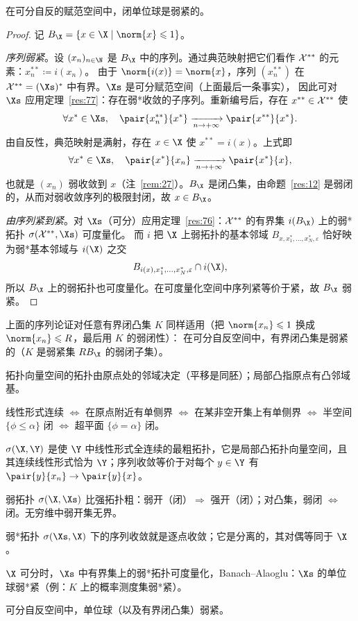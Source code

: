 \begin{corollary}
\label{res:79}
在可分自反的赋范空间中，闭单位球是弱紧的。
\end{corollary}

\begin{proof}
记 $B_\X=\{x\in\X\mid\norm{x}\leqslant1\}$。

\emph{序列弱紧}。设 $(x_n)_{n\in\N}$ 是 $B_\X$ 中的序列。通过典范映射把它们看作 $\mathcal{X}^{**}$ 的元素：$x^{**}_n\coloneqq i(x_n)$。
由于 $\norm{i(x)}=\norm{x}$，序列 $(x^{**}_n)$ 在 $\Xss=(\Xs)^*$ 中有界。$\Xs$ 是可分赋范空间（上面最后一条事实），
因此可对 $\Xs$ 应用定理~\ref{res:77}：存在弱*收敛的子序列。重新编号后，存在 $x^{**}\in\mathcal{X}^{**}$ 使
\[
  \forall x^*\in\Xs,\quad\pair{x^{**}_n}{x^*}\xrightarrow[n\to+\infty]{}\pair{x^{**}}{x^*}.
\]
由自反性，典范映射是满射，存在 $x\in\X$ 使 $x^{**}=i(x)$。上式即
\[
  \forall x^*\in\Xs,\quad\pair{x^*}{x_n}\xrightarrow[n\to+\infty]{}\pair{x^*}{x},
\]
也就是 $(x_n)$ 弱收敛到 $x$（注~\ref{rem:27}）。$B_\X$ 是闭凸集，由命题~\ref{res:12} 是弱闭的，从而对弱收敛序列的极限封闭，故 $x\in B_\X$。

\emph{由序列紧到紧}。对 $\Xs$（可分）应用定理~\ref{res:76}：$\mathcal{X}^{**}$ 的有界集 $i(B_\X)$ 上的弱*拓扑 $\sigma(\Xss,\Xs)$ 可度量化。
而 $i$ 把 $\X$ 上弱拓扑的基本邻域 $B_{x,x^*_1,\dots,x^*_N,\varepsilon}$ 恰好映为弱*基本邻域与 $i(\X)$ 之交
\[
  B_{i(x),x^*_1,\dots,x^*_N,\varepsilon}\cap i(\X),
\]
所以 $B_\X$ 上的弱拓扑也可度量化。在可度量化空间中序列紧等价于紧，故 $B_\X$ 弱紧。
\end{proof}

\begin{remark}
上面的序列论证对任意有界闭凸集 $K$ 同样适用（把 $\norm{x_n}\leqslant1$ 换成 $\norm{x_n}\leqslant R$，最后用 $K$ 的弱闭性）：
在可分自反空间中，有界闭凸集是弱紧的（$K$ 是弱紧集 $R B_\X$ 的弱闭子集）。
\end{remark}

\begin{keypoints}
  \item 拓扑向量空间的拓扑由原点处的邻域决定（平移是同胚）；局部凸指原点有凸邻域基。
  \item 线性形式连续 $\iff$ 在原点附近有单侧界 $\iff$ 在某非空开集上有单侧界 $\iff$ 半空间 $\{\phi\leqslant\alpha\}$ 闭 $\iff$ 超平面 $\{\phi=\alpha\}$ 闭。
  \item $\sigma(\X,\Y)$ 是使 $\Y$ 中线性形式全连续的最粗拓扑，它是局部凸拓扑向量空间，且其连续线性形式恰为 $\Y$；序列收敛等价于对每个 $y\in\Y$ 有 $\pair{y}{x_n}\to\pair{y}{x}$。
  \item 弱拓扑 $\sigma(\X,\Xs)$ 比强拓扑粗：弱开（闭）$\Rightarrow$ 强开（闭）；对凸集，弱闭 $\iff$ 闭。无穷维中弱开集无界。
  \item 弱*拓扑 $\sigma(\Xs,\X)$ 下的序列收敛就是逐点收敛；它是分离的，其对偶等同于 $\X$。
  \item $\X$ 可分时，$\Xs$ 中有界集上的弱*拓扑可度量化，Banach--Alaoglu：$\Xs$ 的单位球弱*紧（例：$K$ 上的概率测度集弱*紧）。
  \item 可分自反空间中，单位球（以及有界闭凸集）弱紧。
\end{keypoints}
